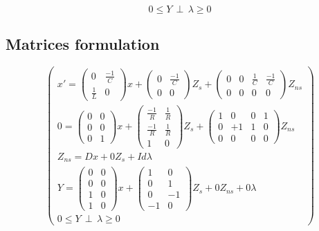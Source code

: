 \documentclass[10pt]{article}
\begin{document}
\[0 \leq Y \, \perp \, \lambda \geq 0\]



\subsection{Matrices formulation}
\[
\left(\begin{array}{c}
  
x'=\left(\begin{array}{cc}
0 &\frac{-1}{C}\\
\frac{1}{L}&0\end{array} \right)x
+\left(\begin{array}{cc}
0&\frac{-1}{C}\\
0&0\end{array} \right)Z_{s}
+\left(\begin{array}{cccc}
0&0&\frac{1}{C}&\frac{-1}{C}\\
0&0&0&0\end{array} \right)Z_{ns}
\\
0=\left(\begin{array}{cc}
0 &0\\
0 &0\\
0 &1\end{array} \right)x
+\left(\begin{array}{cc}
\frac{-1}{R}&\frac{1}{R}\\
\frac{-1}{R}&\frac{1}{R}\\
1&0\end{array} \right)Z_{s}
+\left(\begin{array}{cccc}
1&0&0&1\\
0&+1&1&0\\
0&0&0&0\end{array} \right)Z_{ns}
\\
Z_{ns}=Dx+0Z_{s}+Id\lambda\\
Y=\left(\begin{array}{cc}
0&0\\
0&0\\
1&0\\
1&0\end{array}\right) x+
\left(\begin{array}{cc}
1&0\\
0&1\\
0&-1\\
-1&0\end{array}
\right) Z_{s} + 0Z_{ns} +0\lambda\\

0 \leq Y \, \perp \, \lambda \geq 0

\end{array}
\right)
\]
\end{document}
